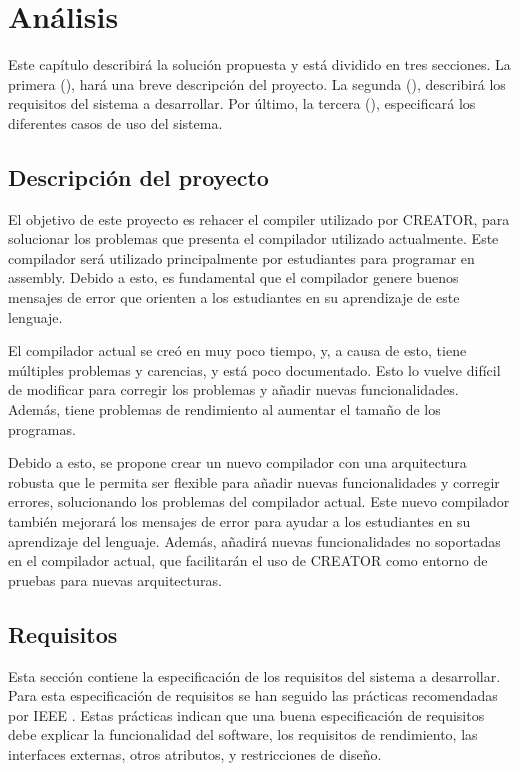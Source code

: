 \chapter{Análisis}\label{chap:analysis}

Este capítulo describirá la solución propuesta y está dividido en tres
secciones. La primera (), hará una breve descripción del
proyecto. La segunda (), describirá los requisitos del
sistema a desarrollar. Por último, la tercera (),
especificará los diferentes casos de uso del sistema.

\section{Descripción del proyecto}\label{sec:description}

El objetivo de este proyecto es rehacer el \gls{compiler} utilizado por CREATOR,
para solucionar los problemas que presenta el compilador utilizado actualmente.
Este compilador será utilizado principalmente por estudiantes para programar en
\gls{assembly}. Debido a esto, es fundamental que el compilador genere buenos
mensajes de error que orienten a los estudiantes en su aprendizaje de este
lenguaje.

El compilador actual se creó en muy poco tiempo, y, a causa de esto, tiene
múltiples problemas y carencias, y está poco documentado. Esto lo vuelve difícil
de modificar para corregir los problemas y añadir nuevas funcionalidades.
Además, tiene problemas de rendimiento al aumentar el tamaño de los programas.

Debido a esto, se propone crear un nuevo compilador con una arquitectura robusta
que le permita ser flexible para añadir nuevas funcionalidades y corregir
errores, solucionando los problemas del compilador actual. Este nuevo compilador
también mejorará los mensajes de error para ayudar a los estudiantes en su
aprendizaje del lenguaje. Además, añadirá nuevas funcionalidades no soportadas
en el compilador actual, que facilitarán el uso de CREATOR como entorno de
pruebas para nuevas arquitecturas.

\section{Requisitos}\label{sec:requirements}

Esta sección contiene la especificación de los requisitos del sistema a
desarrollar. Para esta especificación de requisitos se han seguido las prácticas
recomendadas por IEEE \parencite{requirementsIEEE}. Estas prácticas indican que
una buena especificación de requisitos debe explicar la funcionalidad del
software, los requisitos de rendimiento, las interfaces externas, otros
atributos, y restricciones de diseño.

